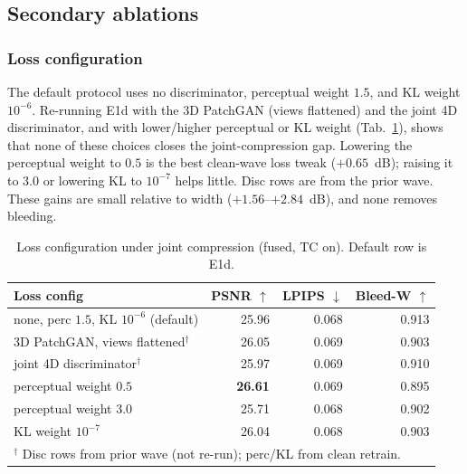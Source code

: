 \subsection{Secondary ablations}



\subsubsection{Loss configuration}

The default protocol uses no discriminator, perceptual weight $1.5$, and KL weight $10^{-6}$. Re-running E1d with the 3D PatchGAN (views flattened) and the joint 4D discriminator, and with lower/higher perceptual or KL weight (Tab.~\ref{tab:loss}), shows that none of these choices closes the joint-compression gap. Lowering the perceptual weight to $0.5$ is the best clean-wave loss tweak (${+}0.65$~dB); raising it to $3.0$ or lowering KL to $10^{-7}$ helps little. Disc rows are from the prior wave. These gains are small relative to width (${+}1.56$--${+}2.84$~dB), and none removes bleeding.

\begin{table}[t]
\centering
\caption{Loss configuration under joint compression (fused, TC on). Default row is E1d.}
\label{tab:loss}
\begin{tabular}{lrrr}
\toprule
Loss config & PSNR $\uparrow$ & LPIPS $\downarrow$ & Bleed-W $\uparrow$ \\
\midrule
none, perc $1.5$, KL $10^{-6}$ (default) & 25.96 & 0.068 & 0.913 \\
\midrule
3D PatchGAN, views flattened$^\dagger$  & 26.05 & 0.069 & 0.903 \\
joint 4D discriminator$^\dagger$        & 25.97 & 0.069 & 0.910 \\
\midrule
perceptual weight $0.5$                 & \textbf{26.61} & 0.069 & 0.895 \\
perceptual weight $3.0$                 & 25.71 & 0.068 & 0.902 \\
KL weight $10^{-7}$                     & 26.04 & 0.068 & 0.903 \\
\bottomrule
\multicolumn{4}{l}{\small $^\dagger$ Disc rows from prior wave (not re-run); perc/KL from clean retrain.}\\
\end{tabular}
\end{table}


